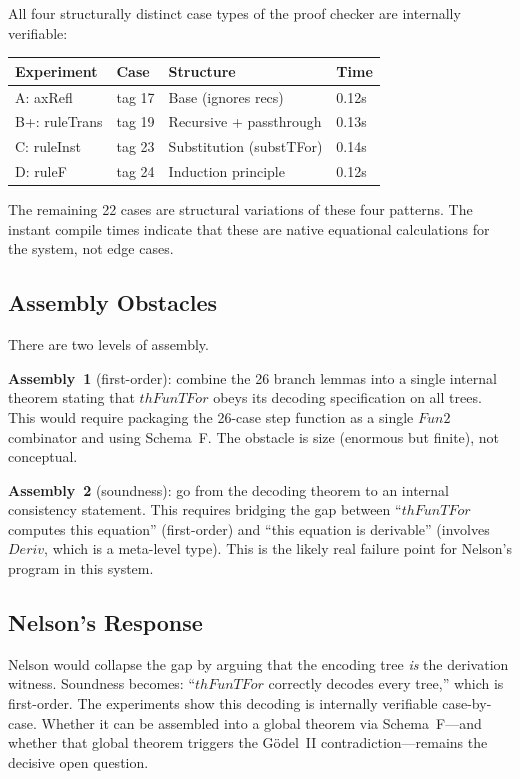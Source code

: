 \documentclass[11pt]{article}
\begin{document}
All four structurally distinct case types of the proof checker are
internally verifiable:

\begin{center}
\begin{tabular}{llll}
\hline
\textbf{Experiment} & \textbf{Case} & \textbf{Structure} & \textbf{Time} \\
\hline
A: axRefl & tag 17 & Base (ignores recs) & 0.12s \\
B+: ruleTrans & tag 19 & Recursive + passthrough & 0.13s \\
C: ruleInst & tag 23 & Substitution (substTFor) & 0.14s \\
D: ruleF & tag 24 & Induction principle & 0.12s \\
\hline
\end{tabular}
\end{center}

The remaining 22 cases are structural variations of these four patterns.
The instant compile times indicate that these are native equational
calculations for the system, not edge cases.

\subsection{Assembly Obstacles}

There are two levels of assembly.

\textbf{Assembly~1} (first-order): combine the 26 branch lemmas into a
single internal theorem stating that $\mathit{thFunTFor}$ obeys its
decoding specification on all trees. This would require packaging the
26-case step function as a single $\mathit{Fun2}$ combinator and using
Schema~F. The obstacle is size (enormous but finite), not conceptual.

\textbf{Assembly~2} (soundness): go from the decoding theorem to an
internal consistency statement. This requires bridging the gap between
``$\mathit{thFunTFor}$ computes this equation'' (first-order) and
``this equation is derivable'' (involves $\mathit{Deriv}$, which is a
meta-level type). This is the likely real failure point for Nelson's
program in this system.

\subsection{Nelson's Response}

Nelson would collapse the gap by arguing that the encoding tree \emph{is}
the derivation witness. Soundness becomes: ``$\mathit{thFunTFor}$ correctly
decodes every tree,'' which is first-order. The experiments show this
decoding is internally verifiable case-by-case. Whether it can be
assembled into a global theorem via Schema~F---and whether that global
theorem triggers the G\"odel~II contradiction---remains the decisive
open question.
\end{document}
